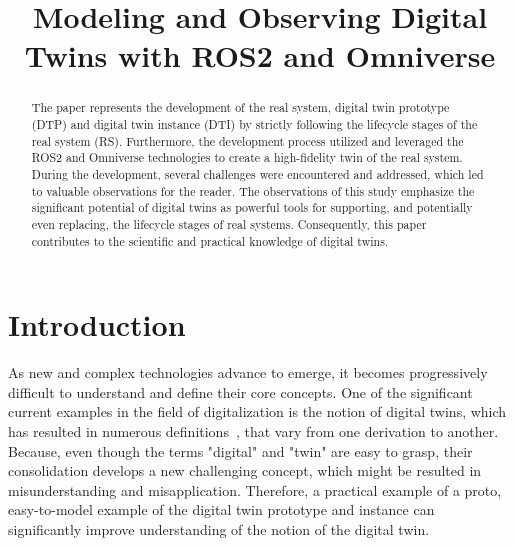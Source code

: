\documentclass[conference]{IEEEtran}
\begin{document}
    \title{Modeling and Observing Digital Twins with ROS2 and Omniverse}
    \author{ 
    }
    
    \maketitle

    \begin{abstract}
        The paper represents the development of the real system, digital twin prototype (DTP) and digital twin instance (DTI) by strictly following the lifecycle stages of the real system (RS).  
        Furthermore, the development process utilized and leveraged the ROS2 and Omniverse technologies to create a high-fidelity twin of the real system. During the development, several challenges were encountered and addressed, which led to
        valuable observations for the reader. The observations of this study emphasize the significant potential of digital twins as powerful tools for supporting, and potentially even replacing,
        the lifecycle stages of real systems. Consequently, this paper contributes to the scientific and practical knowledge of digital twins. 
        
    \end{abstract}

    \section{Introduction}\label{section:introduction}
    As new and complex technologies advance to emerge, it becomes progressively difficult to understand and define their core concepts.
    One of the significant current examples in the field of digitalization is the notion of digital twins, which has resulted in numerous definitions~\cite{Review1}, 
    that vary from one derivation to another. Because, even though the terms "digital" and "twin" are easy to grasp, their consolidation develops a new challenging concept, 
    which might be resulted in misunderstanding and misapplication. Therefore, a practical example of a proto, easy-to-model example of the digital twin prototype and instance 
    can significantly improve understanding of the notion of the digital twin.
    
\end{document}
